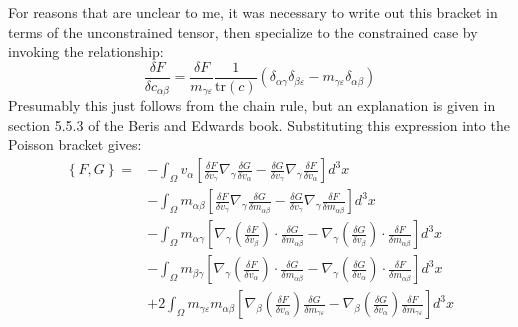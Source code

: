 \documentclass[reqno]{article}
\begin{document}
  For reasons that are unclear to me, it was necessary to write out this bracket
  in terms of the unconstrained tensor, then specialize to the constrained case
  by invoking the relationship:
  \begin{equation}
    \frac{\delta F}{\delta c_{\alpha \beta}}
    =
    \frac{\delta F}{m_{\gamma\varepsilon}} \frac{1}{\text{tr}(c)}
    \left(
      \delta_{\alpha \gamma} \delta_{\beta \varepsilon}
      -
      m_{\gamma \varepsilon}
      \delta_{\alpha \beta}
    \right)
  \end{equation}
  Presumably this just follows from the chain rule, but an explanation is given
  in section 5.5.3 of the Beris and Edwards book.
  Substituting this expression into the Poisson bracket gives:
  \begin{equation} \label{eq:conservative-bracket}
    \begin{split}
      \left\{ F, G \right\}
      =
      &- \int_\Omega v_\alpha
      \left[ \frac{\delta F}{\delta v_\gamma} \nabla_\gamma \frac{\delta G}{\delta v_\alpha}
        - \frac{\delta G}{\delta v_\gamma} \nabla_\gamma \frac{\delta F}{\delta v_\alpha}
      \right] d^3x \\
      &- \int_\Omega m_{\alpha \beta} \left[
        \frac{\delta F}{\delta v_\gamma} \nabla_\gamma \frac{\delta G}{\delta m_{\alpha \beta}}
        - \frac{\delta G}{\delta v_\gamma} \nabla_\gamma \frac{\delta F}{\delta m_{\alpha \beta}}
      \right] d^3 x\\
      &- \int_\Omega m_{\alpha \gamma} \left[
        \nabla_\gamma \left(\frac{\delta F}{\delta v_\beta}\right) \cdot \frac{\delta G}{\delta m_{\alpha \beta}}
        - \nabla_\gamma \left(\frac{\delta G}{\delta v_\beta}\right) \cdot \frac{\delta F}{\delta m_{\alpha \beta}}
      \right] d^3 x\\
      &- \int_\Omega m_{\beta \gamma} \left[
        \nabla_\gamma \left(\frac{\delta F}{\delta v_\alpha}\right) \cdot \frac{\delta G}{\delta m_{\alpha \beta}}
        - \nabla_\gamma \left(\frac{\delta G}{\delta v_\alpha}\right) \cdot \frac{\delta F}{\delta m_{\alpha \beta}}
      \right] d^3x \\
      &+ 2 \int_\Omega m_{\gamma\varepsilon} m_{\alpha\beta} \left[
        \nabla_\beta \left( \frac{\delta F}{\delta v_\alpha} \right) \frac{\delta G}{\delta m_{\gamma\varepsilon}}
        - \nabla_\beta \left( \frac{\delta G}{\delta v_\alpha} \right) \frac{\delta F}{\delta m_{\gamma\varepsilon}}
      \right] d^3 x
    \end{split}
  \end{equation}
\end{document}
